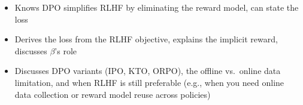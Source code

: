 \begin{interviewq}

\goodgreat
\begin{itemize}
    \item {} Knows DPO simplifies RLHF by eliminating the reward model, can state the loss
    \item {} Derives the loss from the RLHF objective, explains the implicit reward, discusses $\beta$'s role
    \item {} Discusses DPO variants (IPO, KTO, ORPO), the offline vs.\ online data limitation, and when RLHF is still preferable (e.g., when you need online data collection or reward model reuse across policies)
\end{itemize}

\end{interviewq}

